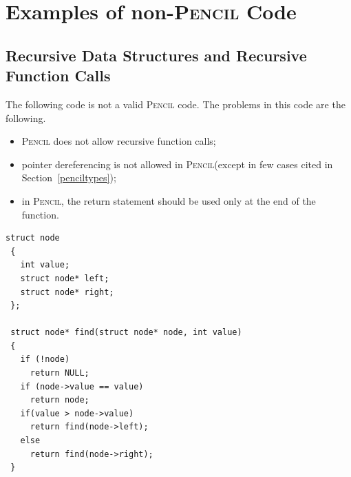 \documentclass{carp}
\newcommand\pencil{\textsc{Pencil}\xspace}
\begin{document}
\section{Examples of non-\pencil Code}

\subsection{Recursive Data Structures and Recursive Function Calls}

The following code is not a valid \pencil code.  The problems in this
code are the following.
\begin{itemize}
  \item \pencil does not allow recursive function calls;
  \item pointer dereferencing is not allowed in \pencil (except
        in few cases cited in Section~\ref{penciltypes});
  \item in \pencil, the return statement should be used only at
        the end of the function.
\end{itemize}

\begin{lstlisting}[language=pencil]
 struct node
 {
   int value;
   struct node* left;
   struct node* right;
 };

 struct node* find(struct node* node, int value)
 {
   if (!node)
     return NULL;
   if (node->value == value)
     return node;
   if(value > node->value)
     return find(node->left);
   else
     return find(node->right);
 }
\end{lstlisting}




\end{document}
